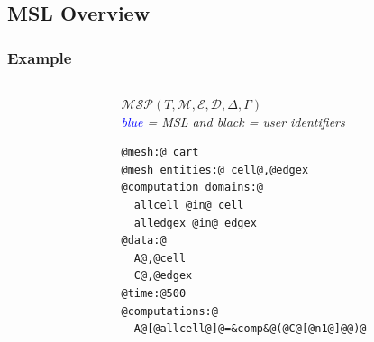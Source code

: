 \documentclass{beamer}
\begin{document}
\subsection{MSL Overview}

\begin{frame}[fragile]
\frametitle{Example}
\begin{columns}
\begin{column}{.52\textwidth}
\hspace{10pt}
\end{column}
\begin{column}{.48\textwidth}
$\mathcal{MSP}(T,\mathcal{M},\mathcal{E},\mathcal{D},\Delta,\Gamma)$\\

\medskip
\textit{\textcolor{blue}{blue} = MSL and black = user identifiers}

\medskip
\begin{lstlisting}[style=base]
@mesh:@ cart
@mesh entities:@ cell@,@edgex
@computation domains:@
  allcell @in@ cell
  alledgex @in@ edgex
@data:@
  A@,@cell
  C@,@edgex
@time:@500
@computations:@
  A@[@allcell@]@=&comp&@(@C@[@n1@]@@)@
\end{lstlisting}
\end{column}
\end{columns}
\end{frame}
\end{document}

